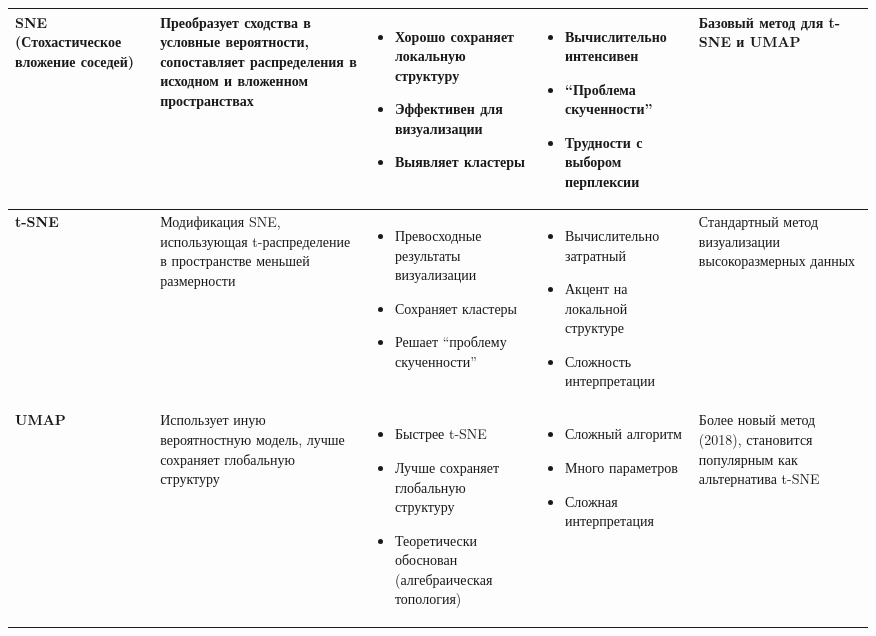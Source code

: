 \documentclass[a4paper,12pt]{article}
\begin{document}
{\begin{longtable}{|p{3.5cm}|p{3.5cm}|p{2.8cm}|p{2.8cm}|p{2.8cm}|}
\textbf{SNE (Стохастическое вложение соседей)} & 
Преобразует сходства в условные вероятности, сопоставляет распределения в исходном и вложенном пространствах & 
\begin{itemize}[leftmargin=*]
    \item Хорошо сохраняет локальную структуру
    \item Эффективен для визуализации
    \item Выявляет кластеры
\end{itemize} & 
\begin{itemize}[leftmargin=*]
    \item Вычислительно интенсивен
    \item ``Проблема скученности''
    \item Трудности с выбором перплексии
\end{itemize} & 
Базовый метод для t-SNE и UMAP \\
\hline

\textbf{t-SNE} & 
Модификация SNE, использующая t-распределение в пространстве меньшей размерности & 
\begin{itemize}[leftmargin=*]
    \item Превосходные результаты визуализации
    \item Сохраняет кластеры
    \item Решает ``проблему скученности''
\end{itemize} & 
\begin{itemize}[leftmargin=*]
    \item Вычислительно затратный
    \item Акцент на локальной структуре
    \item Сложность интерпретации
\end{itemize} & 
Стандартный метод визуализации высокоразмерных данных \\
\hline

\textbf{UMAP} & 
Использует иную вероятностную модель, лучше сохраняет глобальную структуру & 
\begin{itemize}[leftmargin=*]
    \item Быстрее t-SNE
    \item Лучше сохраняет глобальную структуру
    \item Теоретически обоснован (алгебраическая топология)
\end{itemize} & 
\begin{itemize}[leftmargin=*]
    \item Сложный алгоритм
    \item Много параметров
    \item Сложная интерпретация
\end{itemize} & 
Более новый метод (2018), становится популярным как альтернатива t-SNE \\
\hline


\end{longtable}}
\end{document}
